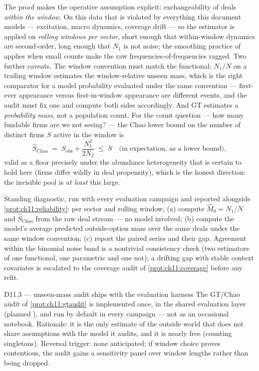 The proof makes the operative assumption explicit: exchangeability of
deals \emph{within the window}. On this data that is violated by
everything this document models --- excitation, macro dynamics, coverage
drift --- so the estimator is applied on \emph{rolling windows per
sector}, short enough that within-window dynamics are second-order,
long enough that $N_1$ is not noise; the smoothing practice of
\citet{galesampson1995} applies when small counts make the raw
frequencies-of-frequencies ragged. Two further caveats. The window
convention must match the functional: $N_1/N$ on a trailing window
estimates the window-relative unseen mass, which is the right comparator
for a model probability evaluated under the same convention ---
first-ever appearance versus first-in-window appearance are different
events, and the audit must fix one and compute both sides accordingly.
And GT estimates a \emph{probability mass}, not a population count. For
the count question --- how many fundable firms are we not seeing? --- the
Chao lower bound \citep{chao1984} on the number of distinct firms $S$
active in the window is
\begin{equation}\label{eq:ch11:chao}
\widehat S_{\mathrm{Chao}} \;=\; S_{\mathrm{obs}} + \frac{N_1^2}{2N_2}
 \;\le\; S \quad\text{(in expectation, as a lower bound)},
\end{equation}
valid as a floor precisely under the abundance heterogeneity that is
certain to hold here (firms differ wildly in deal propensity), which is
the honest direction: the invisible pool is \emph{at least} this large.

\begin{protocol}\label{prot:ch11:gtaudit}
Standing diagnostic, run with every evaluation campaign and reported
alongside \cref{prot:ch11:reliability}: per sector and rolling window,
(a) compute $\widehat M_0 = N_1/N$ and $\widehat S_{\mathrm{Chao}}$ from
the raw deal stream --- no model involved; (b) compute the model's
average predicted outside-option mass over the same deals under the same
window convention; (c) report the paired series and their gap. Agreement
within the binomial noise band is a nontrivial consistency check
(two estimators of one functional, one parametric and one not);
a drifting gap with stable context covariates is escalated to the
coverage audit of \cref{prot:ch11:coverage} before any refit.
\end{protocol}

\begin{decision}{D11.3 --- unseen-mass audit ships with the evaluation harness}
The GT/Chao audit of \cref{prot:ch11:gtaudit} is implemented once, in the
shared evaluation layer (planned ), and
run by default in every campaign --- not as an occasional notebook.
Rationale: it is the only estimate of the outside world that does not
share assumptions with the model it audits, and it is nearly free
(counting singletons). Reversal trigger: none anticipated; if window
choice proves contentious, the audit gains a sensitivity panel over
window lengths rather than being dropped.
\end{decision}

